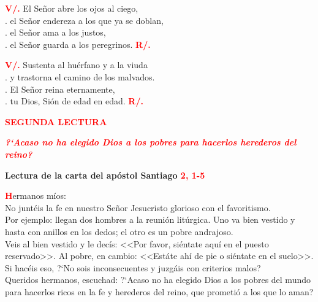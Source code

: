 \documentclass[12pt, letterpaper]{report}
\begin{document}
{\bfseries \textcolor{red}{V/.}} \hspace{1cm} El Se\~nor abre los ojos al ciego,\\
. \hspace{2.5cm} el Se\~nor endereza a los que ya se doblan,\\
. \hspace{2.5cm} el Se\~nor ama a los justos,\\
. \hspace{2.5cm} el Se\~nor guarda a los peregrinos.
\hspace{1cm} {\bfseries \textcolor{red}{R/.}}

{\bfseries \textcolor{red}{V/.}} \hspace{1cm} Sustenta al hu\'erfano y a la viuda\\
. \hspace{2.5cm} y trastorna el camino de los malvados.\\
. \hspace{2.5cm} El Se\~nor reina eternamente,\\
. \hspace{2.5cm} tu Dios, Si\'on de edad en edad.
\hspace{1cm} {\bfseries \textcolor{red}{R/.}}

\begin{center}
\Large {\bfseries \textcolor{red}{SEGUNDA LECTURA}}
\end{center}

\begin{center}
\large {\bfseries \textit{ \textcolor{red}{?`Acaso no ha elegido Dios a los pobres para hacerlos herederos del reino?}}}
\end{center}

\Large {\bfseries Lectura de la carta del ap\'ostol Santiago \hspace{1cm} \textcolor{red}{2, 1-5}}

\lettrine[lines=2]{\bfseries \textcolor{red}{H}}{}\Large ermanos m\'ios:\\
No junt\'eis la fe en nuestro Se\~nor Jesucristo glorioso con el favoritismo.\\
Por ejemplo: llegan dos hombres a la reuni\'on lit\'urgica. Uno va bien vestido y hasta con anillos en los dedos; el otro es un pobre andrajoso.\\
Veis al bien vestido y le dec\'is: <<Por favor, si\'entate aqu\'i en el puesto reservado>>. Al pobre, en cambio: <<Est\'ate ah\'i de pie o si\'entate en el suelo>>.\\
Si hac\'eis eso, ?`No sois inconsecuentes y juzg\'ais con criterios malos?\\
Queridos hermanos, escuchad: ?`Acaso no ha elegido Dios a los pobres del mundo para hacerlos ricos en la fe y herederos del reino, que prometi\'o a los que lo aman?
\end{document}
